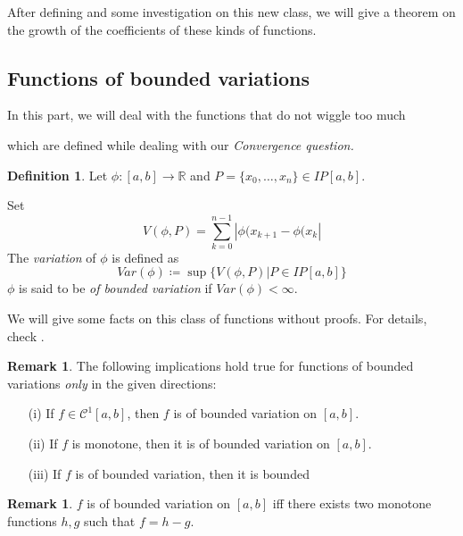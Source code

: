 \documentclass[12pt]{amsart}
\theoremstyle{definition}
\newtheorem{definition}[theorem]{Definition}
\newtheorem{remark}[theorem]{Remark}
\newcommand{\RR}{{\mathbb R}} %
\newcommand{\cC}{{\mathcal C}}
\begin{document}
After defining and some investigation on this new class, we will give a theorem on the growth of the coefficients of these kinds of functions.


\subsection{Functions of bounded variations}


In this part, we will deal with the functions that do not wiggle too much \footnotemark{}



which are defined while dealing with our \emph{Convergence question.}


\begin{definition}
    Let $\phi : [a,b] \to \RR$ and $P = \{x_0, \dots, x_n\} \in IP[a,b]$.
\footnotemark{}




Set
\[
V(\phi,P) = \sum_{k=0}^{n-1}|\phi(x_{k+1} - \phi(x_{k}|
\]
The \emph{variation} of $\phi$ is defined as
\begin{equation}
    Var(\phi) \coloneqq \sup\{V(\phi,P)| P \in IP[a,b]\}
\end{equation}
$\phi$ is said to be \emph{of bounded variation} if $Var(\phi) < \infty$. \footnotemark{}
\end{definition}


We will give some facts on this class of functions without proofs. For details, check \cite{Wade}.


\begin{remark} \label{bounded var. implications}The following implications hold true for functions of bounded variations \emph{only} in the given directions:
    \begin{itemize}
        \item[(i)] If  $f \in \cC^1[a,b]$, then $f$ is of bounded variation on $[a, b]$.
        \item[(ii)] If  $f$ is monotone, then it is of bounded variation on $[a, b]$.
        \item[(iii)] If $f$ is of bounded variation, then it is bounded
    \end{itemize}
\end{remark}


\begin{remark}
     $f$ is of bounded variation on $[a,b]$ iff there exists two monotone functions $h,g$ such that $f = h - g$.
\end{remark}
\end{document}
